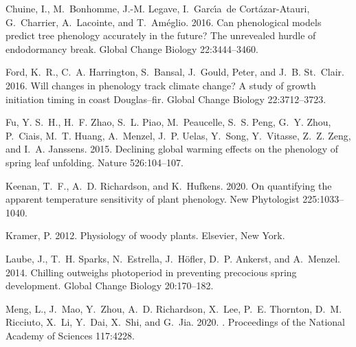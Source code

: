 \documentclass[11pt,letter]{article}
\begin{document}
\begin{thebibliography}{10}
\providecommand{\natexlab}[1]{#1}

Chuine, I., M.~Bonhomme, J.-M. Legave, I.~Garc{\'\i}a~de Cort{\'a}zar-Atauri,
  G.~Charrier, A.~Lacointe, and T.~Am{\'e}glio. 2016.
\newblock Can phenological models predict tree phenology accurately in the
  future? {T}he unrevealed hurdle of endodormancy break.
\newblock Global Change Biology 22:3444--3460.

Ford, K.~R., C.~A. Harrington, S.~Bansal, J.~Gould, Peter, and J.~B. St.~Clair.
  2016.
\newblock Will changes in phenology track climate change? {A} study of growth
  initiation timing in coast {Douglas--fir}.
\newblock Global Change Biology 22:3712--3723.

Fu, Y. S.~H., H.~F. Zhao, S.~L. Piao, M.~Peaucelle, S.~S. Peng, G.~Y. Zhou,
  P.~Ciais, M.~T. Huang, A.~Menzel, J.~P. Uelas, Y.~Song, Y.~Vitasse, Z.~Z.
  Zeng, and I.~A. Janssens. 2015.
\newblock Declining global warming effects on the phenology of spring leaf
  unfolding.
\newblock Nature 526:104--107.

Keenan, T.~F., A.~D. Richardson, and K.~Hufkens. 2020.
\newblock On quantifying the apparent temperature sensitivity of plant
  phenology.
\newblock New Phytologist 225:1033--1040.

Kramer, P. 2012.
\newblock Physiology of woody plants.
\newblock Elsevier, New York.

Laube, J., T.~H. Sparks, N.~Estrella, J.~H{\"o}fler, D.~P. Ankerst, and
  A.~Menzel. 2014.
\newblock Chilling outweighs photoperiod in preventing precocious spring
  development.
\newblock Global Change Biology 20:170--182.

Meng, L., J.~Mao, Y.~Zhou, A.~D. Richardson, X.~Lee, P.~E. Thornton, D.~M.
  Ricciuto, X.~Li, Y.~Dai, X.~Shi, and G.~Jia. 2020.
.
\newblock Proceedings of the National Academy of Sciences 117:4228.


\end{thebibliography}
\end{document}
